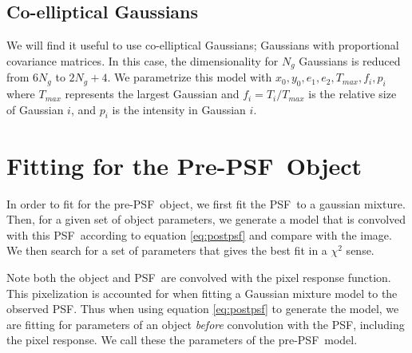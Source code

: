 \documentclass[10pt,preprint]{aastex}
\newcommand{\psf}{PSF}
\begin{document}
\subsection{Co-elliptical Gaussians}

We will find it useful to use co-elliptical Gaussians; Gaussians with
proportional covariance matrices.  In this case, the dimensionality for $N_g$
Gaussians is reduced from $6 N_g$ to $2 N_g + 4$.  We parametrize this model
with $x_0, y_0, e_1, e_2, T_{max}, f_{i}, p_{i}$ where $T_{max}$ represents
the largest Gaussian and $f_{i} = T_{i}/T_{max}$ is the relative size of
Gaussian $i$, and $p_i$ is the intensity in Gaussian $i$.











\section{Fitting for the Pre-\psf\ Object}

In order to fit for the pre-\psf\ object, we first fit the \psf\ to a gaussian
mixture.  Then, for a given set of object parameters, we generate a model that
is convolved with this \psf\ according to equation \ref{eq:postpsf} and compare
with the image.  We then search for a set of parameters that gives the best fit
in a $\chi^2$ sense.  

Note both the object and \psf\ are convolved with the pixel response function.
This pixelization is accounted for when fitting a Gaussian mixture model to the
observed \psf.  Thus when using equation \ref{eq:postpsf} to generate the
model, we are fitting for parameters of an object {\it before} convolution with
the \psf, including the pixel response.  We call these the parameters of the
pre-\psf\ model.
\end{document}
